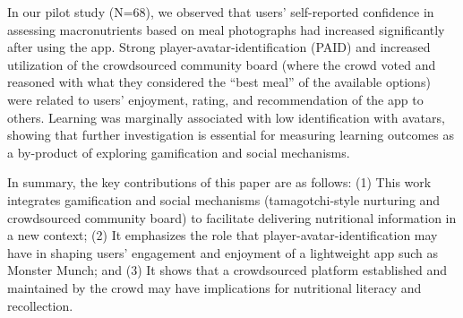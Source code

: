 

In our pilot study (N=68), we observed that users' self-reported confidence in assessing macronutrients based on meal photographs had increased significantly after using the app. Strong player-avatar-identification (PAID) and increased utilization of the crowdsourced community board (where the crowd voted and reasoned with what they considered the ``best meal'' of the available options) were related to users' enjoyment, rating, and recommendation of the app to others. Learning was marginally associated with low identification with avatars, showing that further investigation is essential for measuring learning outcomes as a by-product of exploring gamification and social mechanisms.

In summary, the key contributions of this paper are as follows: (1) This work integrates 
gamification and social mechanisms (tamagotchi-style nurturing and crowdsourced community board) to facilitate delivering nutritional information in a new context; (2) It emphasizes the role that player-avatar-identification may have in shaping users' engagement and enjoyment of a lightweight app such as Monster Munch; and (3) It shows that a crowdsourced platform established and maintained by the crowd may have implications for nutritional literacy and recollection.




